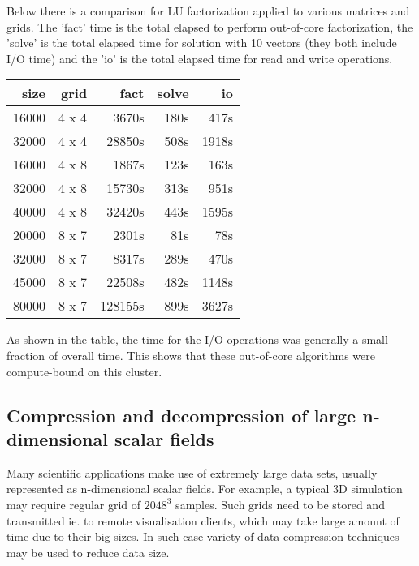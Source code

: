 Below there is a comparison for LU factorization applied to various matrices and grids.
The 'fact' time is the total elapsed to perform out-of-core factorization, 
the 'solve' is the total elapsed time for solution with 10 vectors (they both include I/O time) and
the 'io' is the total elapsed time for read and write operations.
\bigskip

\begin{center}
\begin{tabular}{|r|r|r|r|r|} \hline
    size & grid & fact & solve & io \\ \hline
    
    16000 & 4 x 4 & 3670s & 180s & 417s \\
    32000 & 4 x 4 & 28850s & 508s & 1918s \\ \hline
    
    16000 & 4 x 8 & 1867s & 123s & 163s \\
    32000 & 4 x 8 & 15730s & 313s & 951s \\
    40000 & 4 x 8 & 32420s & 443s & 1595s \\ \hline
    
    20000 & 8 x 7 & 2301s & 81s & 78s \\
    32000 & 8 x 7 & 8317s & 289s & 470s \\
    45000 & 8 x 7 & 22508s & 482s & 1148s \\
    80000 & 8 x 7 & 128155s & 899s & 3627s \\ \hline    
    
    
\end{tabular}
\end{center}
\bigskip

As shown in the table, the time for the I/O operations was generally a small fraction of overall time. 
This shows that these out-of-core algorithms were compute-bound on this cluster. 


\subsection{Compression and decompression of large n-dimensional scalar fields}


Many scientific applications make use of extremely large data sets, usually 
represented as n-dimensional scalar fields. For example, a typical 3D simulation
may require regular grid of $2048^{3}$ samples. Such grids need to be
stored and transmitted ie. to remote visualisation clients, which may take
large amount of time due to their big sizes. In such case variety of data compression
techniques may be used to reduce data size.

